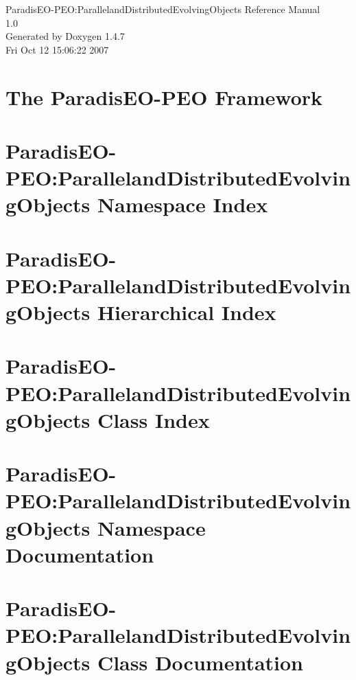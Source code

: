 \documentclass[a4paper]{book}
\begin{document}
\begin{titlepage}
\vspace*{7cm}
\begin{center}
{\Large Paradis\-EO-PEO:Paralleland\-Distributed\-Evolving\-Objects Reference Manual\\[1ex]\large 1.0 }\\
\vspace*{1cm}
{\large Generated by Doxygen 1.4.7}\\
\vspace*{0.5cm}
{\small Fri Oct 12 15:06:22 2007}\\
\end{center}
\end{titlepage}
\clearemptydoublepage
{}
\tableofcontents
\clearemptydoublepage
{}
\chapter{The Paradis\-EO-PEO Framework }
\label{index}\hypertarget{index}{}
\chapter{Paradis\-EO-PEO:Paralleland\-Distributed\-Evolving\-Objects Namespace Index}

\chapter{Paradis\-EO-PEO:Paralleland\-Distributed\-Evolving\-Objects Hierarchical Index}

\chapter{Paradis\-EO-PEO:Paralleland\-Distributed\-Evolving\-Objects Class Index}

\chapter{Paradis\-EO-PEO:Paralleland\-Distributed\-Evolving\-Objects Namespace Documentation}

\chapter{Paradis\-EO-PEO:Paralleland\-Distributed\-Evolving\-Objects Class Documentation}























\printindex
\end{document}
